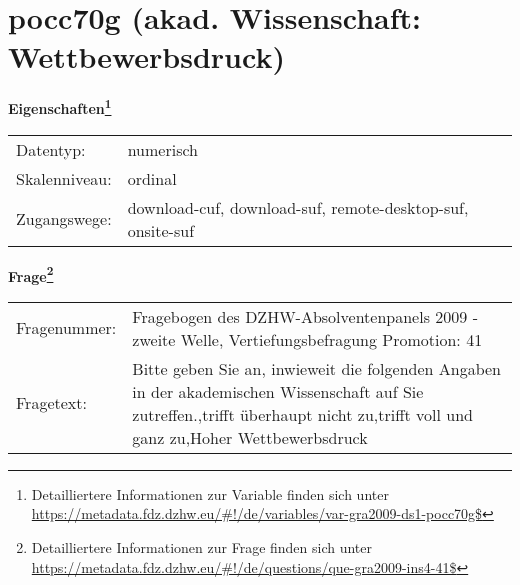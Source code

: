 
    \setcounter{footnote}{0}

    \vspace*{-1.8cm}
	\section{pocc70g (akad. Wissenschaft: Wettbewerbsdruck)}
	\label{section:pocc70g}



    \vspace*{0.5cm}
    \noindent\textbf{Eigenschaften\footnote{Detailliertere Informationen zur Variable finden sich unter
		\url{https://metadata.fdz.dzhw.eu/\#!/de/variables/var-gra2009-ds1-pocc70g$}}}\\
	\begin{tabularx}{\hsize}{@{}lX}
	Datentyp: & numerisch \\
	Skalenniveau: & ordinal \\
	Zugangswege: &
	  download-cuf, 
	  download-suf, 
	  remote-desktop-suf, 
	  onsite-suf
 \\
    \end{tabularx}



				\vspace*{0.5cm}
                \noindent\textbf{Frage\footnote{Detailliertere Informationen zur Frage finden sich unter
		              \url{https://metadata.fdz.dzhw.eu/\#!/de/questions/que-gra2009-ins4-41$}}}\\
				\begin{tabularx}{\hsize}{@{}lX}
					Fragenummer: &
					  Fragebogen des DZHW-Absolventenpanels 2009 - zweite Welle, Vertiefungsbefragung Promotion:
					  41
 \\
					Fragetext: & Bitte geben Sie an, inwieweit die folgenden Angaben in der akademischen Wissenschaft auf Sie zutreffen.,trifft überhaupt nicht zu,trifft voll und ganz zu,Hoher Wettbewerbsdruck \\
				\end{tabularx}





